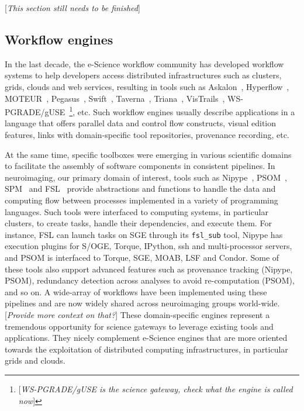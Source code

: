\documentclass[preprint,3p,twocolumn]{elsarticle}
\newcommand{\todo}[1]{\color{blue}\xspace[\emph{#1}]\xspace\color{black}}
\begin{document}
\todo{This section still needs to be finished}

\subsection{Workflow engines}

In the last decade, the e-Science workflow community has developed
workflow systems to help developers access distributed infrastructures
such as clusters, grids, clouds and web services, resulting in tools
such as Askalon~\cite{fahringer2005askalon},
Hyperflow~\cite{balis2016hyperflow}, MOTEUR~\cite{GLAT-08i},
Pegasus~\cite{deelman2005pegasus,Deelman201517},
Swift~\cite{zhao2007swift}, Taverna~\cite{oinn2004taverna},
Triana~\cite{taylor2007triana}, VisTrails~\cite{callahan2006managing},
WS-PGRADE/gUSE~\cite{Kacsuk2012}\footnote{\todo{WS-PGRADE/gUSE is the
    science gateway, check what the engine is called now}}, etc. Such
workflow engines usually describe applications in a  language
that offers parallel data and control flow constructs, visual edition
features, links with domain-specific tool repositories, provenance
recording, etc.

At the same time, specific toolboxes were emerging in various
scientific domains to facilitate the assembly of software components
in consistent pipelines. In neuroimaging, our primary domain of
interest, tools such as Nipype~\cite{gorgolewski2011nipype},
PSOM~\cite{bellec2012pipeline}, SPM~\cite{ashburner2011spm} and
FSL~\cite{Jenkinson2012782} provide abstractions and functions to
handle the data and computing flow between processes implemented in a
variety of programming languages. Such tools were interfaced to
computing systems, in particular clusters, to create tasks, handle
their dependencies, and execute them. For instance, FSL can launch
tasks on SGE through its \texttt{fsl\_sub} tool, Nipype has execution
plugins for S/OGE, Torque, IPython, ssh and multi-processor servers,
and PSOM is interfaced to Torque, SGE, MOAB, LSF and Condor. Some of
these tools also support advanced features such as provenance tracking
(Nipype, PSOM), redundancy detection across analyses to avoid
re-computation (PSOM), and so on. A wide-array of workflows have been
implemented using these pipelines and are now widely shared across
neuroimaging groups world-wide. \todo{Provide more context on that?}
These domain-specific engines represent a tremendous opportunity for
science gateways to leverage existing tools and applications. They
nicely complement e-Science engines that are more oriented towards the
exploitation of distributed computing infrastructures, in particular
grids and clouds.
\end{document}
